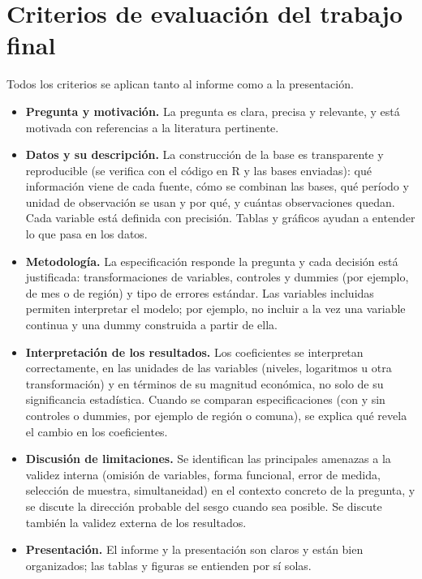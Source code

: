 \documentclass[letterpaper,11pt]{article}
\begin{document}
\section*{Criterios de evaluación del trabajo final}
Todos los criterios se aplican tanto al informe como a la presentación.
\begin{itemize}
  \item \textbf{Pregunta y motivación.} La pregunta es clara, precisa y relevante, y está motivada con referencias a la literatura pertinente.
  \item \textbf{Datos y su descripción.} La construcción de la base es transparente y reproducible (se verifica con el código en R y las bases enviadas): qué información viene de cada fuente, cómo se combinan las bases, qué período y unidad de observación se usan y por qué, y cuántas observaciones quedan. Cada variable está definida con precisión. Tablas y gráficos ayudan a entender lo que pasa en los datos.
  \item \textbf{Metodología.} La especificación responde la pregunta y cada decisión está justificada: transformaciones de variables, controles y dummies (por ejemplo, de mes o de región) y tipo de errores estándar. Las variables incluidas permiten interpretar el modelo; por ejemplo, no incluir a la vez una variable continua y una dummy construida a partir de ella.
  \item \textbf{Interpretación de los resultados.} Los coeficientes se interpretan correctamente, en las unidades de las variables (niveles, logaritmos u otra transformación) y en términos de su magnitud económica, no solo de su significancia estadística. Cuando se comparan especificaciones (con y sin controles o dummies, por ejemplo de región o comuna), se explica qué revela el cambio en los coeficientes.
  \item \textbf{Discusión de limitaciones.} Se identifican las principales amenazas a la validez interna (omisión de variables, forma funcional, error de medida, selección de muestra, simultaneidad) en el contexto concreto de la pregunta, y se discute la dirección probable del sesgo cuando sea posible. Se discute también la validez externa de los resultados.
  \item \textbf{Presentación.} El informe y la presentación son claros y están bien organizados; las tablas y figuras se entienden por sí solas.
\end{itemize}
\end{document}
